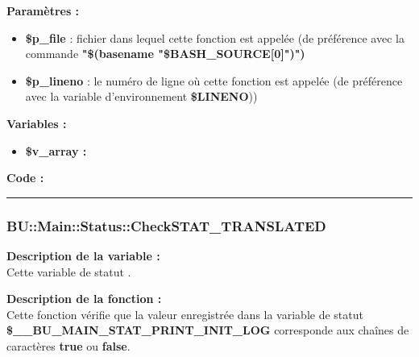 \documentclass[a4paper,10pt]{article}
\begin{document}
\begin{justify}
    \textbf{Paramètres :}

    \begin{itemize}
        \item \color{orange}\textbf{\$p\_file}\color{white} : fichier dans lequel cette fonction est appelée (de préférence avec la commande \textbf{"\$(\color{gray}basename \color{white}"\color{orange}\$BASH\_SOURCE[0]\color{white}")")}\\

        \item \color{orange}\textbf{\$p\_lineno}\color{white} : le numéro de ligne où cette fonction est appelée (de préférence avec la variable d'environnement \textbf{\color{orange}\$LINENO}))
    \end{itemize}
\end{justify}

\begin{justify}
    \textbf{Variables :}

    \begin{itemize}
        \item \textbf{\color{orange}\$v\_array\color{white} :}
    \end{itemize}
\end{justify}

\begin{justify}
    \textbf{Code :}
\end{justify}



\color{blue}\par\noindent\rule{\textwidth}{0.4pt}\color{white}

\color{blue}
\subsubsection{\color{mauve}BU::Main::Status::CheckSTAT\_TRANSLATED}\color{white}

\begin{justify}
    \textbf{Description de la variable :}\\
    Cette variable de statut .
\end{justify}

\begin{justify}
    \textbf{Description de la fonction :}\\
    Cette fonction vérifie que la valeur enregistrée dans la variable de statut \textbf{\color{orange}\$\_\_BU\_MAIN\_STAT\_PRINT\_INIT\_LOG} corresponde aux chaînes de caractères \textbf{true} ou \textbf{false}.
\end{justify}
\end{document}
